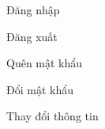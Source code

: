 Đăng nhập



















Đăng xuất



















Quên mật khẩu





































Đổi mật khẩu



















Thay đổi thông tin




















